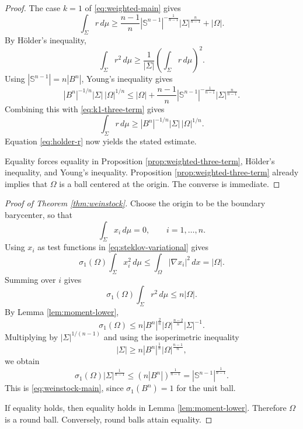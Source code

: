 \documentclass[10pt,a4paper]{amsart}
\numberwithin{equation}{section}
\newcommand{\Sn}{\mathbb S}
\newcommand{\Om}{\Omega}
\newcommand{\Sig}{\Sigma}
\begin{document}
\begin{proof}
The case $k=1$ of \eqref{eq:weighted-main} gives
\begin{equation}\label{eq:k1-three-term}
    \int_\Sig r\,d\mu
    \geq
    \frac{n-1}{n}|\Sn^{n-1}|^{-\frac1{n-1}}|\Sig|^{\frac n{n-1}}
    +|\Om|.
\end{equation}
By H\"older's inequality,
\begin{equation}\label{eq:holder-r}
    \int_\Sig r^2\,d\mu
    \geq
    \frac1{|\Sig|}\left(\int_\Sig r\,d\mu\right)^2.
\end{equation}
Using $|\Sn^{n-1}|=n|B^n|$, Young's inequality gives
\begin{equation*}
    |B^n|^{-1/n}|\Sig|\,|\Om|^{1/n}
    \leq
    |\Om|+\frac{n-1}{n}|\Sn^{n-1}|^{-\frac1{n-1}}|\Sig|^{\frac n{n-1}}.
\end{equation*}
Combining this with \eqref{eq:k1-three-term} gives
\begin{equation*}
    \int_\Sig r\,d\mu
    \geq
    |B^n|^{-1/n}|\Sig|\,|\Om|^{1/n}.
\end{equation*}
Equation \eqref{eq:holder-r} now yields the stated estimate.

Equality forces equality in Proposition \ref{prop:weighted-three-term}, H\"older's inequality, and Young's inequality.  Proposition \ref{prop:weighted-three-term} already implies that $\Om$ is a ball centered at the origin.  The converse is immediate.
\end{proof}


\begin{proof}[Proof of Theorem \ref{thm:weinstock}]
Choose the origin to be the boundary barycenter, so that
\begin{equation*}
    \int_\Sig x_i\,d\mu=0,
    \qquad i=1,\ldots,n.
\end{equation*}
Using $x_i$ as test functions in \eqref{eq:steklov-variational} gives
\begin{equation*}
    \sigma_1(\Om)\int_\Sig x_i^2\,d\mu
    \leq
    \int_\Om|\nabla x_i|^2\,dx
    =|\Om|.
\end{equation*}
Summing over $i$ gives
\begin{equation*}
    \sigma_1(\Om)\int_\Sig r^2\,d\mu
    \leq n|\Om|.
\end{equation*}
By Lemma \ref{lem:moment-lower},
\begin{equation*}
    \sigma_1(\Om)
    \leq
    n|B^n|^{\frac2n}|\Om|^{\frac{n-2}{n}}|\Sig|^{-1}.
\end{equation*}
Multiplying by $|\Sig|^{1/(n-1)}$ and using the isoperimetric inequality
\begin{equation*}
    |\Sig|\geq n|B^n|^{\frac1n}|\Om|^{\frac{n-1}{n}},
\end{equation*}
we obtain
\begin{equation*}
    \sigma_1(\Om)|\Sig|^{\frac1{n-1}}
    \leq
    (n|B^n|)^{\frac1{n-1}}
    =|\Sn^{n-1}|^{\frac1{n-1}}.
\end{equation*}
This is \eqref{eq:weinstock-main}, since $\sigma_1(B^n)=1$ for the unit ball.

If equality holds, then equality holds in Lemma \ref{lem:moment-lower}.  Therefore $\Om$ is a round ball.  Conversely, round balls attain equality.
\end{proof}
\end{document}
